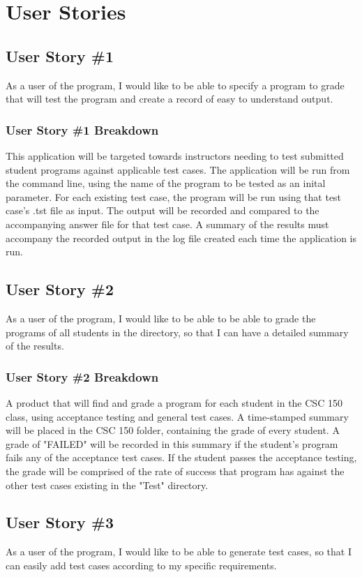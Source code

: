 \section{User Stories}

\subsection{User Story \#1}
As a user of the program, I would like to be able to specify a program to grade that will test the program and create a record of easy to understand output.

\subsubsection{User Story \#1 Breakdown}
This application will be targeted towards instructors needing to test submitted student programs against applicable test
cases.  The application will be run from the command line, using the name of the program to be tested as an inital parameter.
For each existing test case, the program will be run using that test case's .tst file as input.  The output will be recorded and 
compared to the accompanying answer file for that test case.  A summary of the results must accompany the recorded
output in the log file created each time the application is run.


\subsection{User Story \#2} 
As a user of the program, I would like to be able to be able to grade the programs of all students in the directory, so that I can have a detailed summary of the results.
\subsubsection{User Story \#2 Breakdown}
A product that will find and grade a program for each student in the CSC 150 class, using acceptance testing and general test cases. A time-stamped summary will be placed in the CSC 150 folder, containing the grade of every student.  A grade of "FAILED" will be recorded in this summary if the student's program fails any of the acceptance test cases.  If the student passes the acceptance testing, the grade will be comprised of the rate of success that program has against the other test cases existing in the "Test" directory.

\subsection{User Story \#3} 
As a user of the program, I would like to be able to generate test cases, so that I can easily add test cases according to my specific requirements.
